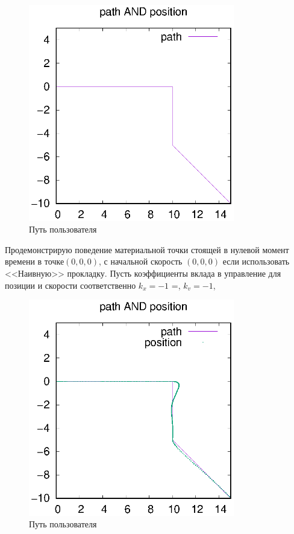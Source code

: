 \documentclass[a4paper,12pt]{article}
\newcounter{def}
\begin{document}
\begin{figure}[ht!]
\centering
\includegraphics[width=90mm]{default_path.eps}
\caption{ Путь пользователя}\label{user_path}
\end{figure}

Продемонстрирую поведение материальной точки стоящей в нулевой момент времени в точке$(0,0,0)$, с начальной скорость $(0,0,0)$ если использовать <<Наивную>> прокладку. Пусть коэффициенты вклада в управление для позиции и скорости соответственно $k_x = -1$ =,  $k_v = -1$, 

\begin{figure}[H]
\centering
\includegraphics[width=90mm]{default_path_not_procladka.eps}
\caption{ Путь пользователя}\label{not_prokladka}
\end{figure}
\end{document}
